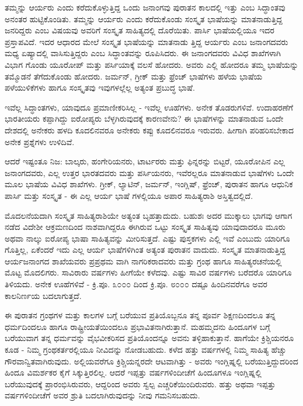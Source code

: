 ತಮ್ಮನ್ನು ಆರ್ಯರು ಎಂದು ಕರೆದುಕೊಳ್ಳುತ್ತಿದ್ದ ಒಂದು ಜನಾಂಗವು ಪುರಾತನ ಕಾಲದಲ್ಲಿ ಇತ್ತು ಎಂಬ ಸಿದ್ಧಾಂತವು ಅನಂತರ ಹುಟ್ಟಿಕೊಂಡಿತು. ತಮ್ಮನ್ನು ಆರ್ಯರು ಎಂದು ಕರೆದುಕೊಂಡು ಸಂಸ್ಕೃತ ಭಾಷೆಯನ್ನು ಮಾತನಾಡುತ್ತಿದ್ದ ಜನರಿದ್ದರು ಎಂಬ ವಿಷಯವು ಅವರಿಗೆ ಸಂಸ್ಕೃತ ಸಾಹಿತ್ಯದಲ್ಲಿ ದೊರೆಯಿತು. ಪಾರ್ಸಿ ಭಾಷೆಯಲ್ಲಿಯೂ ಇದರ ಪ್ರಸ್ತಾಪವಿದೆ. ಇದರ ಆಧಾರದ ಮೇಲೆ ಸಂಸ್ಕೃತ ಭಾಷೆಯನ್ನು ಮಾತನಾಡು ತ್ತಿದ್ದ ಆರ್ಯರು ಎಂಬ ಜನಾಂಗದವರು ಮಧ್ಯ ಏಷ್ಯಾದಲ್ಲಿ ವಾಸಿಸುತ್ತಿದ್ದರು ಎಂಬ ಸಿದ್ಧಾಂತವನ್ನು ರೂಪಿಸಿದರು. ಈ ಜನಾಂಗದವರು ವಿವಿಧ ಶಾಖೆಗಳಾಗಿ ವಿಭಾಗ ಗೊಂಡು ಯೂರೋಪ್ ಮತ್ತು ಪರ್ಸಿಯಾಕ್ಕೆ ವಲಸೆ ಹೋದರು. ಅವರು ಎಲ್ಲಿ ಹೋದರೂ ತಮ್ಮ ಭಾಷೆಯನ್ನು ತಮ್ಮೊಡನೆ ತೆಗೆದುಕೊಂಡು ಹೋದರು. ಜರ್ಮನ್, ಗ್ರೀಕ್ ಮತ್ತು ಫ್ರೆಂಚ್ ಭಾಷೆಗಳು ಹಳೆಯ ಭಾಷೆಯ ಪಳೆಯುಳಿಕೆಗಳು ಹಾಗೂ ಸಂಸ್ಕೃತವು ಇವುಗಳಲ್ಲೆಲ್ಲ ಅತ್ಯಂತ ಪ್ರಬುದ್ಧ ಭಾಷೆ.

ಇವೆಲ್ಲ ಸಿದ್ಧಾಂತಗಳು, ಯಾವುದೂ ಪ್ರಮಾಣೀಕರಿಸಿಲ್ಲ - ಇವೆಲ್ಲ ಊಹೆಗಳು. ಅನೇಕ ತೊಡರುಗಳಿವೆ. ಉದಾಹರಣೆಗೆ ಭಾರತೀಯರು ಕಪ್ಪಾಗಿದ್ದು ಐರೋಪ್ಯರು ಬೆಳ್ಳಗಿರುವುದಕ್ಕೆ ಕಾರಣವೇನು? ಈ ಭಾಷೆಗಳನ್ನು ಮಾತನಾಡುವ ಒಂದೇ ದೇಶದಲ್ಲಿ ಅನೇಕರು ಹಳದಿ ಕೂದಲಿನವರೂ ಅನೇಕರು ಕಪ್ಪು ಕೂದಲಿನವರೂ ಇರುವರು. ಹೀಗಾಗಿ ಪರಿಹರಿಸಬೇಕಾದ ಅನೇಕ ಪ್ರಶ್ನೆಗಳು ಉಳಿದಿವೆ.

ಆದರೆ ಇಷ್ಟಂತೂ ನಿಜ: ಬಾಲ್ಕರು, ಹಂಗೇರಿಯನರು, ಟಾರ್ಟರರು ಮತ್ತು ಫಿನ್ನರನ್ನು ಬಿಟ್ಟರೆ, ಯೂರೋಪಿನ ಎಲ್ಲ ಜನಾಂಗದವರು, ಎಲ್ಲ ಉತ್ತರ ಭಾರತದವರು ಮತ್ತು ಪರ್ಸಿಯನರು, ಇವೆರಲ್ಲರೂ ಮಾತನಾಡುವ ಭಾಷೆಗಳು ಒಂದೇ ಮೂಲ ಭಾಷೆಯ ವಿವಿಧ ಶಾಖೆಗಳು. ಗ್ರೀಕ್, ಲ್ಯಾಟಿನ್, ಜರ್ಮನ್, ಇಂಗ್ಲಿಷ್, ಫ್ರೆಂಚ್, ಪುರಾತನ ಹಾಗೂ ಆಧುನಿಕ ಪಾರ್ಸಿ ಮತ್ತು ಸಂಸ್ಕೃತ - ಈ ಎಲ್ಲ ಆರ್ಯ ಭಾಷೆ ಗಳಲ್ಲಿಯೂ ಅಪಾರ ಸಾಹಿತ್ಯರಾಶಿ ಅಸ್ತಿತ್ವದಲ್ಲಿದೆ.

ಮೊದಲನೆಯದಾಗಿ ಸಂಸ್ಕೃತ ಸಾಹಿತ್ಯರಾಶಿಯೇ ಅತ್ಯಂತ ಬೃಹತ್ತಾದುದು. ಬಹುಶಃ ಅದರ ಮುಕ್ಕಾಲು ಭಾಗವು ಆಗಾಗ ನಡೆದ ವಿದೇಶೀ ಆಕ್ರಮಣದಿಂದ ನಾಶವಾಗಿದ್ದರೂ ಈಗಿರುವ ಒಟ್ಟು ಸಂಸ್ಕೃತ ಸಾಹಿತ್ಯವು ಯಾವುದಾದರೂ ಮೂರು ಅಥವಾ ನಾಲ್ಕು ಐರೋಪ್ಯ ಭಾಷಾ ಸಾಹಿತ್ಯವನ್ನು ಮೀರಿಸುತ್ತದೆ. ಎಷ್ಟು ಪುಸ್ತಕಗಳು ಎಲ್ಲಿ ಇವೆ ಎಂಬುದು ಯಾರಿಗೂ ಗೊತ್ತಿಲ್ಲ, ಏಕೆಂದರೆ ಇದು ಎಲ್ಲ ಆರ್ಯ ಭಾಷೆಗಳಿಗಿಂತ ಅತ್ಯಂತ ಪುರಾತನ ವಾದುದು. ಸಂಸ್ಕೃತ ಮಾತನಾಡುತ್ತಿದ್ದ ಆರ್ಯಜನಾಂಗದ ಶಾಖೆಯವರು ಪ್ರಪ್ರಥಮ ವಾಗಿ ನಾಗರಿಕರಾದವರು ಮತ್ತು ಗ್ರಂಥ ಹಾಗೂ ಸಾಹಿತ್ಯರಚನೆಯಲ್ಲಿ ಮೊಟ್ಟ ಮೊದಲಿಗರು. ಸಾವಿರಾರು ವರ್ಷಗಳು ಹೀಗೆಯೇ ಕಳೆದವು. ಎಷ್ಟು ಸಾವಿರ ವರ್ಷಗಳು ಬರೆದರೊ ಯಾರಿಗೂ ತಿಳಿಯದು. ಅನೇಕ ಊಹೆಗಳಿವೆ - ಕ್ರಿ.ಪೂ. ೩೦೦೦ ದಿಂದ ಕ್ರಿ.ಪೂ. ೮೦೦೦ ದಷ್ಟೂ ಹಿಂದಿನವರೆಗೂ ಅವರ ಕಾಲನಿರ್ಣಯ ಬದಲಾಗುತ್ತದೆ.

ಈ ಪುರಾತನ ಗ್ರಂಥಗಳ ಮತ್ತು ಕಾಲಗಳ ಬಗ್ಗೆ ಬರೆಯುವ ಪ್ರತಿಯೊಬ್ಬನೂ ತನ್ನ ಪೂರ್ವ ಶಿಕ್ಷಣದಿಂದಲೂ ತನ್ನ ಧರ್ಮದಿಂದಲೂ ಹಾಗೂ ರಾಷ್ಟ್ರೀಯತೆಯಿಂದಲೂ ಪ್ರಭಾವಿತನಾಗಿರುತ್ತಾನೆ. ಮಹಮ್ಮದನು ಹಿಂದೂಗಳ ಬಗ್ಗೆ ಬರೆಯುವಾಗ ತನ್ನ ಧರ್ಮವನ್ನು ವೈಭವೀಕರಿಸದ ಪ್ರತಿಯೊಂದನ್ನೂ ಅವನು ತಳ್ಳಿಹಾಕುತ್ತಾನೆ. ಹಾಗೆಯೇ ಕ್ರಿಶ್ಚಿಯನರೂ ಕೂಡ - ನಿಮ್ಮ ಗ್ರಂಥಕರ್ತರಲ್ಲಿಯೂ ನೀವಿದನ್ನು ನೋಡಬಹುದು. ಕಳೆದ ಹತ್ತು ವರ್ಷಗಳಲ್ಲಿ ನಿಮ್ಮ ಸಾಹಿತ್ಯ ಹೆಚ್ಚು ಗೌರವಾನ್ವಿತವಾಗಿರುವುದು. ಅಲ್ಲಿಯವರೆಗೂ ಕ್ರಿಶ್ಚಿಯನ್ನರದೇ ಆಟವಾಗಿತ್ತು - ಅವರು ಇಂಗ್ಲಿಷ್ನಲ್ಲಿ ಬರೆಯುತ್ತಿದ್ದುದರಿಂದ ಹಿಂದೂ ವಿಮರ್ಶಕರ ಕೈಗೆ ಸಿಕ್ಕುತ್ತಿರಲಿಲ್ಲ. ಆದರೆ ಇಪ್ಪತ್ತು ವರ್ಷಗಳಿಂದೀಚೆಗೆ ಹಿಂದೂಗಳೂ ಇಂಗ್ಲಿಷ್ನಲ್ಲಿ ಬರೆಯುವುದಕ್ಕೆ ಪ್ರಾರಂಭಿಸಿರುವರು, ಆದ್ದರಿಂದ ಅವರು ಸ್ವಲ್ಪ ಎಚ್ಚರಿಕೆಯಿಂದಿರುವರು. ಹತ್ತು ಅಥವಾ ಇಪ್ಪತ್ತು ವರ್ಷಗಳಿಂದೀಚೆಗೆ ಅವರ ಶ್ರುತಿ ಬದಲಾಗಿರುವುದನ್ನು ನೀವು ಗಮನಿಸಬಹುದು.

